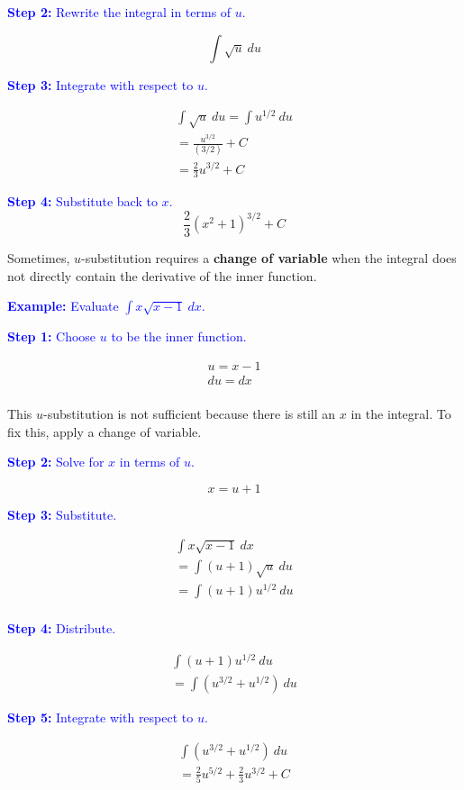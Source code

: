 \documentclass[letterpaper, 12pt]{article}
\newcommand{\example}[1]{\textcolor{blue}{\textbf{Example:} #1}}
\newcommand{\step}[2]{\textcolor{blue}{\textbf{Step #1:} #2}}
\begin{document}
\step{2}{Rewrite the integral in terms of $u$.}

$$\int \sqrt{u} \: du$$

\step{3}{Integrate with respect to $u$.}

\begin{gather*}
\int \sqrt{u} \: du = \int u^{1/2} \: du \\
= \frac{u^{3/2}}{(3/2)} + C \\
= \frac{2}{3} u^{3/2} + C
\end{gather*}

\step{4}{Substitute back to $x$.}
$$\boxed{\frac{2}{3} (x^2 + 1)^{3/2} + C}$$

Sometimes, $u$-substitution requires a \textbf{change of variable} when the integral does not directly contain the derivative of the inner function.

\example{Evaluate $\displaystyle \int x\sqrt{x-1} \: dx$.}

\step{1}{Choose $u$ to be the inner function.}

\begin{gather*}
u = x - 1 \\
du = dx \\
\end{gather*}

This $u$-substitution is not sufficient because there is still an $x$ in the integral. To fix this, apply a change of variable.

\step{2}{Solve for $x$ in terms of $u$.}

$$ x = u + 1 $$

\step{3}{Substitute.}

\begin{gather*}
\int x\sqrt{x-1} \: dx \\
= \int (u + 1) \sqrt{u} \: du \\
= \int (u + 1) u^{1/2} \: du \\
\end{gather*}

\step{4}{Distribute.}

\begin{gather*}
\int (u+1) u^{1/2} \: du \\
= \int (u^{3/2} + u^{1/2}) \: du
\end{gather*}

\step{5}{Integrate with respect to $u$.}

\begin{gather*}
\int (u^{3/2} + u^{1/2}) \: du \\
= \boxed{\frac{2}{5} u^{5/2} + \frac{2}{3} u^{3/2} + C}
\end{gather*}
\end{document}
